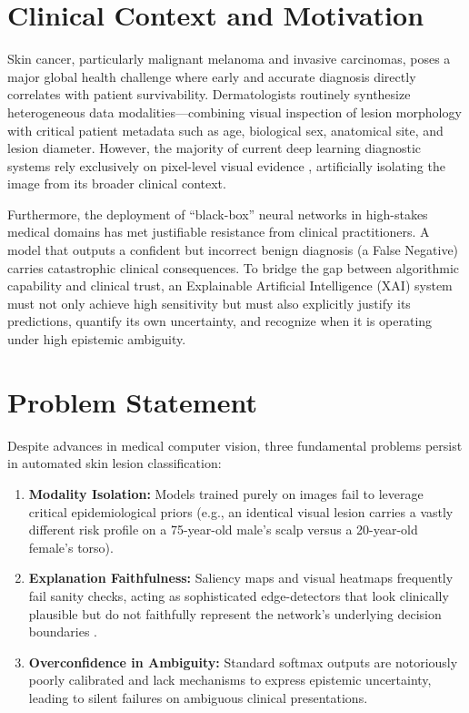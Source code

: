 \documentclass[12pt,a4paper]{report}
\begin{document}
	\section{Clinical Context and Motivation}
	Skin cancer, particularly malignant melanoma and invasive carcinomas, poses a major global health challenge where early and accurate diagnosis directly correlates with patient survivability. Dermatologists routinely synthesize heterogeneous data modalities—combining visual inspection of lesion morphology with critical patient metadata such as age, biological sex, anatomical site, and lesion diameter. However, the majority of current deep learning diagnostic systems rely exclusively on pixel-level visual evidence \cite{esteva2017dermatologist}, artificially isolating the image from its broader clinical context. 
	
	Furthermore, the deployment of ``black-box'' neural networks in high-stakes medical domains has met justifiable resistance from clinical practitioners. A model that outputs a confident but incorrect benign diagnosis (a False Negative) carries catastrophic clinical consequences. To bridge the gap between algorithmic capability and clinical trust, an Explainable Artificial Intelligence (XAI) system must not only achieve high sensitivity but must also explicitly justify its predictions, quantify its own uncertainty, and recognize when it is operating under high epistemic ambiguity. 
	
	\section{Problem Statement}
	Despite advances in medical computer vision, three fundamental problems persist in automated skin lesion classification:
	\begin{enumerate}
		\item \textbf{Modality Isolation:} Models trained purely on images fail to leverage critical epidemiological priors (e.g., an identical visual lesion carries a vastly different risk profile on a 75-year-old male's scalp versus a 20-year-old female's torso).
		\item \textbf{Explanation Faithfulness:} Saliency maps and visual heatmaps frequently fail sanity checks, acting as sophisticated edge-detectors that look clinically plausible but do not faithfully represent the network's underlying decision boundaries \cite{adebayo2018sanity}.
		\item \textbf{Overconfidence in Ambiguity:} Standard softmax outputs are notoriously poorly calibrated and lack mechanisms to express epistemic uncertainty, leading to silent failures on ambiguous clinical presentations.
	\end{enumerate}
	
\end{document}
